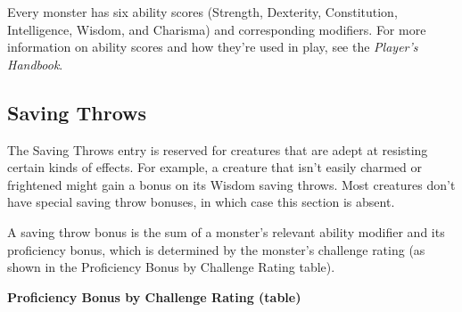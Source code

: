 Every monster has six ability scores (Strength, Dexterity, Constitution, Intelligence, Wisdom, and Charisma) and corresponding modifiers. For more information on ability scores and how they're used in play, see the \textit{Player's Handbook}.

\subsection{Saving Throws}

The Saving Throws entry is reserved for creatures that are adept at resisting certain kinds of effects. For example, a creature that isn't easily charmed or frightened might gain a bonus on its Wisdom saving throws. Most creatures don't have special saving throw bonuses, in which case this section is absent.

A saving throw bonus is the sum of a monster's relevant ability modifier and its proficiency bonus, which is determined by the monster's challenge rating (as shown in the Proficiency Bonus by Challenge Rating table).

\textbf*{Proficiency Bonus by Challenge Rating (table)}

